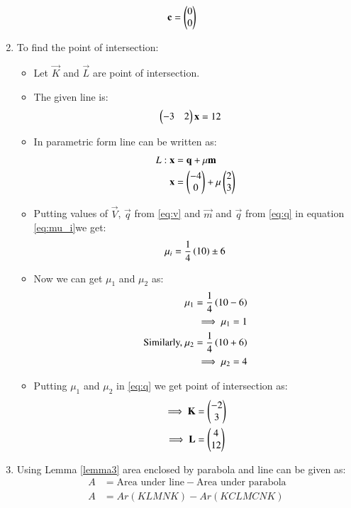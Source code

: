 \documentclass[journal,12pt,twocolumn]{IEEEtran}
\begin{document}
\begin{enumerate}
\begin{align}    
   \mathbf{c} &= \begin{pmatrix}0 \\ 0\end{pmatrix}
\end{align}
\item To find the point of intersection:
\begin{itemize}
    \item Let $\vec{K}$ and $\vec{L}$ are point of intersection.
    \item The given line is:
\begin{align} 
\begin{pmatrix}-3&2\end{pmatrix}\mathbf{x}&=12
\end{align}
\item In parametric form line can be written as:
\begin{align} 
L: \mathbf{x}&=\mathbf{q}+\mu\mathbf{m}
\\
\mathbf{x}&=\begin{pmatrix}-4\\0\end{pmatrix}+\mu\begin{pmatrix}2\\3\end{pmatrix} \label{eq:q}
\end{align}
\item Putting values of $\vec{V}$, $\vec{q}$ from \eqref{eq:v} and $\vec{m}$ and $\vec{q}$ from \eqref{eq:q} in equation \eqref{eq:mu_i}we get:
\begin{align}
\mu_i = \frac{1}{4}
\left(10\right)
\pm{6}
\end{align}
\item Now we can get $\mu_1$ and $\mu_2$ as:
\begin{align}
\mu_1 = \frac{1}{4}\left(10-6\right)
\\
\implies \mu_1 = 1
\\
\text{Similarly, }\mu_2 = \frac{1}{4}\left(10+6\right)
\\
\implies \mu_2 =4
\end{align}
\item Putting $\mu_1$ and $\mu_2$ in \eqref{eq:q} we get point of intersection as:
\begin{align}
\implies \mathbf{K}&= \begin{pmatrix}-2\\3\end{pmatrix}  
\\
\implies \mathbf{L}&= \begin{pmatrix}4\\12\end{pmatrix}
\end{align}
\end{itemize}
\item Using Lemma \eqref{lemma3} area enclosed by parabola and line can be given as:
\begin{align}
   A&= \text{Area under line} - \text{Area under parabola}
     \\
   A&= Ar(KLMNK)-Ar(KCLMCNK)
    \\

\end{align}
\end{enumerate}
\end{document}
